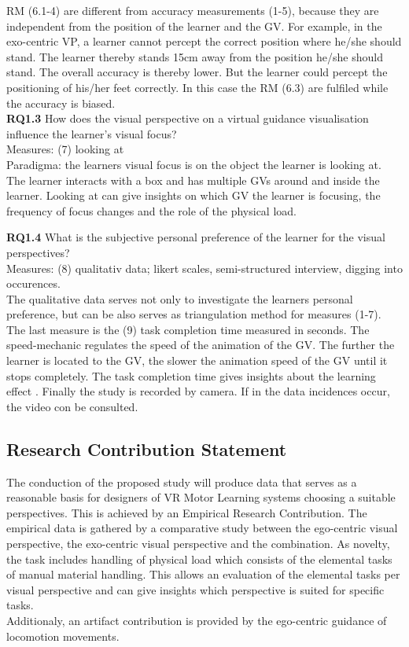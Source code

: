 RM (6.1-4) are different from accuracy measurements (1-5), because they are independent from the position of the learner and the GV. For example, in the exo-centric VP, a learner cannot percept the correct position where he/she should stand. The learner thereby stands 15cm away from the position he/she should stand. The overall accuracy is thereby lower. But the learner could percept the positioning of his/her feet correctly. In this case the RM (6.3) are fulfiled while the accuracy is biased.\\

\textbf{RQ1.3} How does the visual perspective on a virtual guidance visualisation influence the learner's visual focus?\\
Measures: (7) looking at\\
Paradigma: the learners visual focus is on the object the learner is looking at.\\
The learner interacts with a box and has multiple GVs around and inside the learner. Looking at can give insights on which GV the learner is focusing, the frequency of focus changes and the role of the physical load.

\textbf{RQ1.4} What is the subjective personal preference of the learner for the visual perspectives?\\
Measures: (8) qualitativ data; likert scales, semi-structured interview, digging into occurences.\\
The qualitative data serves not only to investigate the learners personal preference, but can be also serves as triangulation method for measures (1-7).\\

The last measure is the (9) task completion time measured in seconds. The speed-mechanic regulates the speed of the animation of the GV. The further the learner is located to the GV, the slower the animation speed of the GV until it stops completely. The task completion time gives insights about the learning effect . Finally the study is recorded by camera. If in the data incidences occur, the video con be consulted.

\subsection{Research Contribution Statement}
\label{delimination_contribution}
The conduction of the proposed study will produce data that serves as a reasonable basis for designers of VR Motor Learning systems choosing a suitable perspectives. This is achieved by an Empirical Research Contribution. The empirical data is gathered by a comparative study between the ego-centric visual perspective, the exo-centric visual perspective and the combination. As novelty, the task includes handling of physical load which consists of the elemental tasks of manual material handling. This allows an evaluation of the elemental tasks per visual perspective and can give insights which perspective is suited for specific tasks.\\
Additionaly, an artifact contribution is provided by the ego-centric guidance of locomotion movements.

